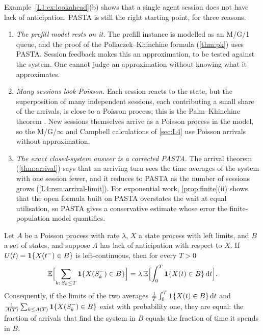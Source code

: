 \begin{remark}\label{L1:rem:why-pasta}
Example~\ref{L1:ex:lookahead}(b) shows that a single agent session does not have lack
of anticipation. PASTA is still the right starting point, for three reasons.
\begin{enumerate}
\item \emph{The prefill model rests on it.} The prefill instance is modelled as an
  M/G/1 queue, and the proof of the Pollaczek--Khinchine formula (\cref{thm:pk}) uses
  PASTA. Session feedback makes this an approximation, to be tested against the
  system. One cannot judge an approximation without knowing what it approximates.
\item \emph{Many sessions look Poisson.} Each session reacts to the state, but the
  superposition of many independent sessions, each contributing a small share of the
  arrivals, is close to a Poisson process; this is the Palm--Khinchine theorem
  \cite{khinchine1960}. New sessions themselves arrive as a Poisson process in the
  model, so the M/G/$\infty$ and Campbell calculations of \cref{sec:L4} use Poisson
  arrivals without approximation.
\item \emph{The exact closed-system answer is a corrected PASTA.} The arrival theorem
  (\cref{thm:arrival}) says that an arriving turn sees the time averages of the system
  with one session fewer, and it reduces to PASTA as the number of sessions grows
  (\cref{L4:rem:arrival-limit}). For exponential work, \cref{prop:finite}(ii) shows
  that the open formula built on PASTA overstates the wait at equal utilisation, so
  PASTA gives a conservative estimate whose error the finite-population model
  quantifies.
\end{enumerate}
\end{remark}

\begin{theorem}\label{thm:pasta}
Let $A$ be a Poisson process with rate $\lambda$, $X$ a state process with left
limits, and $B$ a set of states, and suppose $A$ has lack of anticipation with respect
to $X$. If $U(t)=\mathbf{1}\{X(t^-)\in B\}$ is left-continuous, then for every $T>0$
\begin{equation}\label{L1:eq:pasta}
  \mathbb{E}\Bigl[\sum_{k:\,S_k\le T}\mathbf{1}\{X(S_k^-)\in B\}\Bigr]=\lambda\,\mathbb{E}\Bigl[\int_0^T\mathbf{1}\{X(t)\in B\}\,\mathrm{d} t\Bigr].
\end{equation}
Consequently, if the limits of the two averages
$\frac1T\int_0^T\mathbf{1}\{X(t)\in B\}\,\mathrm{d} t$ and
$\frac{1}{A(T)}\sum_{k\le A(T)}\mathbf{1}\{X(S_k^-)\in B\}$ exist with probability one, they
are equal: the fraction of arrivals that find the system in $B$ equals the fraction of
time it spends in $B$.
\end{theorem}

